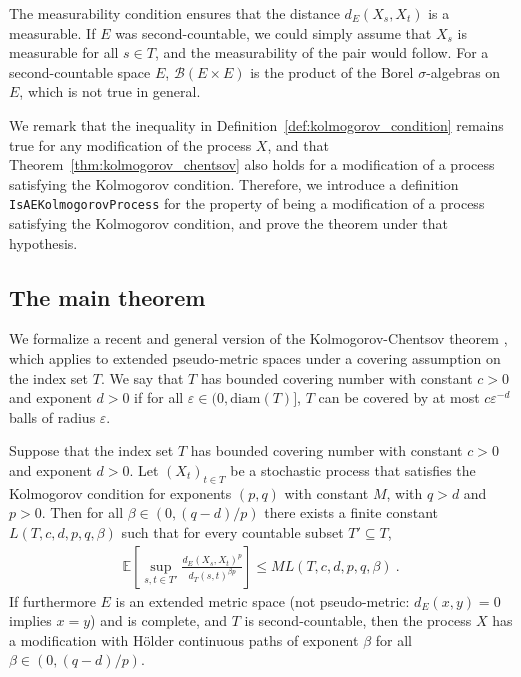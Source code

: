 \documentclass[lean]{Draft}
\begin{document}
The measurability condition ensures that the distance $d_E(X_s, X_t)$ is a measurable.
If $E$ was second-countable, we could simply assume that $X_s$ is measurable for all $s \in T$, and the measurability of the pair would follow.
For a second-countable space $E$, $\mathcal{B}(E \times E)$ is the product of the Borel $\sigma$-algebras on $E$, which is not true in general.

We remark that the inequality in Definition~\ref{def:kolmogorov_condition} remains true for any modification of the process $X$, and that Theorem~\ref{thm:kolmogorov_chentsov} also holds for a modification of a process satisfying the Kolmogorov condition.
Therefore, we introduce a definition \lstinline|IsAEKolmogorovProcess| for the property of being a modification of a process satisfying the Kolmogorov condition, and prove the theorem under that hypothesis.


\subsection{The main theorem}

We formalize a recent and general version of the Kolmogorov-Chentsov theorem \cite[Theorem 1]{kratschmer2023kolmogorov}, which applies to extended pseudo-metric spaces under a covering assumption on the index set $T$.
We say that $T$ has bounded covering number with constant $c > 0$ and exponent $d > 0$ if for all $\varepsilon \in (0, \mathrm{diam}(T)]$, $T$ can be covered by at most $c \varepsilon^{-d}$ balls of radius $\varepsilon$.

\begin{theorem}\label{thm:kolmogorov_chentsov}
Suppose that the index set $T$ has bounded covering number with constant $c>0$ and exponent $d > 0$.
Let $(X_t)_{t \in T}$ be a stochastic process that satisfies the Kolmogorov condition for exponents $(p,q)$ with constant $M$, with $q > d$ and $p > 0$.
Then for all $\beta \in(0, (q - d)/p)$ there exists a finite constant $L(T, c, d, p, q, \beta)$ such that for every countable subset $T' \subseteq T$,
\begin{align*}
  \mathbb{E}\left[ \sup_{s, t \in T'} \frac{d_E(X_s, X_t)^p}{d_T(s, t)^{\beta p}} \right]
  \le M L(T, c, d, p, q, \beta)
  \: .
\end{align*}
If furthermore $E$ is an extended metric space (not pseudo-metric: $d_E(x,y) = 0$ implies $x = y$) and is complete, and $T$ is second-countable, then the process $X$ has a modification with Hölder continuous paths of exponent $\beta$ for all $\beta \in (0, (q - d)/p)$.
\end{theorem}
\end{document}
